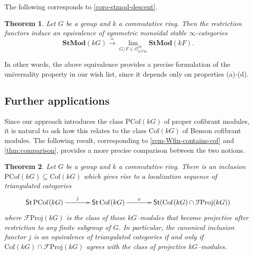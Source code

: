 \documentclass{amsart}
\newcommand{\nameop}{\operatorname{op}\nolimits}
\def \Ofin{{\mathcal O}_{G{\mathcal{F}\textrm{in}}}}
\DeclareMathOperator{\Cof}{Cof}
\numberwithin{equation}{section}%
\newtheorem{thmx}{Theorem}
\theoremstyle{remark}
\begin{document}
The following corresponds to \cref{coro-stmod-descent}. 

\begin{thmx}
     Let $G$ be a group and $k$ a commutative ring. Then the restriction functors induce an equivalence of symmetric monoidal stable $\infty$-categories 
    \[
    \mathbf{StMod}(kG)\xrightarrow[]{\simeq} \lim_{G/F\in \Ofin^{\nameop}}\mathbf{StMod}(kF).
    \]
\end{thmx}


In other words, the above equivalence provides a precise formulation of the universality property in our wish list, since it depends only on properties  (a)-(d). 

\subsection*{Further applications} Since our approach introduces the class $\mathrm{PCof}(kG)$ of proper cofibrant modules, it is natural to ask how this relates to the class $\mathrm{Cof}(kG)$ of Benson cofibrant modules. The following result, corresponding to \cref{rem-Wfin-contains-cof} and \cref{thm:comparison}, provides a more precise comparison between the two notions.

\begin{thmx}
    Let $G$ be a group and $k$ a commutative ring. There is an inclusion $\mathrm{PCof}(kG)\subseteq\mathrm{Cof}(kG)$ which gives rise to a localization sequence of triangulated categories
\begin{equation*}
\xymatrix@C=3pc{
\mathsf{St}\,\mathrm{PCof}(kG) \ar[r]^-{j} & \mathsf{St}\,{\Cof}(kG) \ar[r]^-{\pi} & \mathsf{St}({\mathrm{Cof}(kG)\cap\mathcal{F}\mathrm{Proj}}(kG))
}
\end{equation*}
where $\mathcal{F}\mathrm{Proj}(kG)$  is the class of those $kG$--modules that become  projective after restriction to any finite subgroup of $G$. 
In particular, the canonical inclusion functor $j$ is an equivalence of triangulated categories if and only if $\mathrm{Cof}(kG)\cap\mathcal{F}\mathrm{Proj}(kG)$ agrees with the class of projective $kG$--modules. 
\end{thmx}

\end{document}
